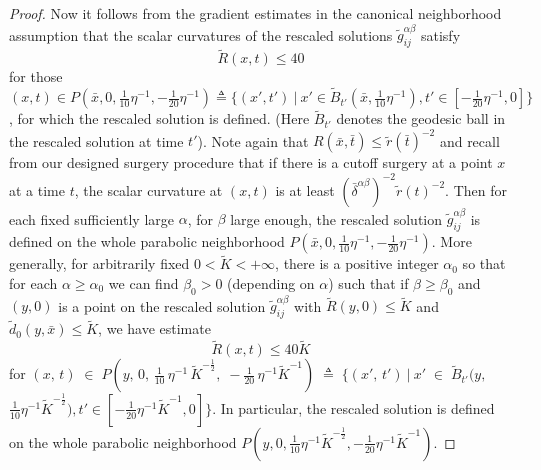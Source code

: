 \begin{proof}
Now it follows from the gradient estimates in the canonical
neighborhood assumption that the scalar curvatures of the rescaled
solutions $\widetilde{g}^{\alpha\beta}_{ij}$ satisfy
$$
\widetilde{R}(x,t)\leq 40
$$
for those $(x,t)\in P(\bar{x},0,\frac{1}{10}\eta^{-1},
-\frac{1}{20}\eta^{-1})\triangleq\{(x',t')\ |\
x'\in\widetilde{B}_{t'}(\bar{x},\frac{1}{10}\eta^{-1}),
t'\in[-\frac{1}{20}\eta^{-1},0]\}$, for which the rescaled
solution is defined. (Here $\widetilde{B}_{t'}$ denotes the
geodesic ball in the rescaled solution at time $t'$). Note again
that $R(\bar{x},\bar{t})\leq \widetilde{r}(\bar{t})^{-2}$ and
recall from our designed surgery procedure that if there is a
cutoff surgery at a point $x$ at a time $t$, the scalar curvature
at $(x,t)$ is at least
$(\bar{\delta}^{\alpha\beta})^{-2}\widetilde{r}({t})^{-2}$. Then
for each fixed sufficiently large $\alpha$, for $\beta$ large
enough, the rescaled solution $\widetilde{g}^{\alpha\beta}_{ij}$
is defined on the whole parabolic neighborhood
$P(\bar{x},0,\frac{1}{10}\eta^{-1},-\frac{1}{20}\eta^{-1})$. More
generally, for arbitrarily fixed $0<\widetilde{K}<+\infty$, there
is a positive integer $\alpha_0$ so that for each $\alpha \geq
\alpha_0$ we can find $\beta_0 >0$ (depending on $\alpha$) such
that if $\beta\geq \beta_0$ and $(y,0)$ is a point on the rescaled
solution $\widetilde{g}^{\alpha\beta}_{ij}$ with
$\widetilde{R}(y,0)\leq\widetilde{K}$ and
$\widetilde{d}_0(y,\bar{x}) \leq \widetilde{K}$, we have estimate
\begin{equation}
\widetilde{R}(x,t)\leq 40\widetilde{K} %
\end{equation} for\; $(x,\,t)\;\in\; P(y,\,0,\,\frac{1}{10}\,\eta^{-1}\,
\widetilde{K}^{-\frac{1}{2}},\;
-\frac{1}{20}\,\eta^{-1}\widetilde{K}^{-1})\;\triangleq\;\{(x',\,t')\
|\ x'\;\in\; \widetilde{B}_{t'}(y,$ $\frac{1}{10}\eta^{-1}
\widetilde{K}^{-\frac{1}{2}}),
t'\in[-\frac{1}{20}\eta^{-1}\widetilde{K}^{-1},0]\}$. In
particular, the rescaled solution is defined on the whole
parabolic neighborhood
$P(y,0,\frac{1}{10}\eta^{-1}\widetilde{K}^{-\frac{1}{2}},
-\frac{1}{20}\eta^{-1}\widetilde{K}^{-1})$.


\end{proof}
